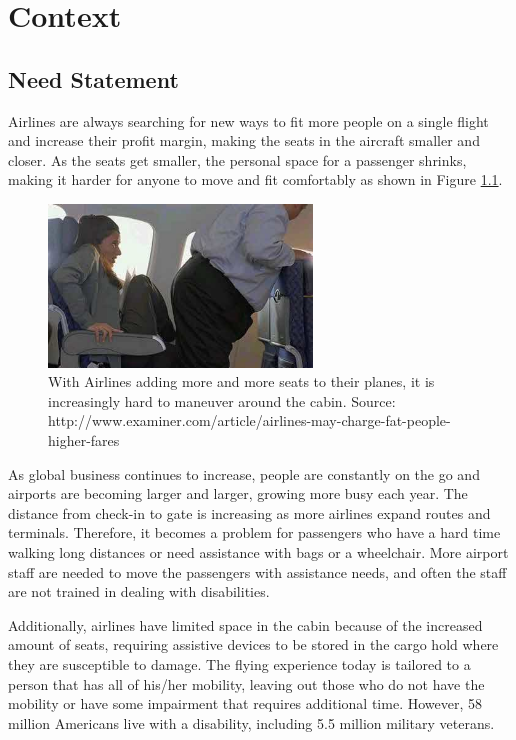 \chapter{Context}
\label{sec-context} %

\section{Need Statement}
Airlines are always searching for new ways to fit more people on a single flight and increase their profit margin, making the seats in the aircraft smaller and closer. As the seats get smaller, the personal space for a passenger shrinks, making it harder for anyone to move and fit comfortably as shown in Figure \ref{fig:9}.

\begin{figure}[h]
  \centering
     \includegraphics[width=7cm]{images/image009.png}
   \caption{With Airlines adding more and more seats to their planes, it is increasingly hard to maneuver around the cabin. 
                  Source: http://www.examiner.com/article/airlines-may-charge-fat-people-higher-fares}
  \label{fig:9}
\end{figure}


As global business continues to increase, people are constantly on the go and airports are becoming larger and larger, growing more busy each year.  The distance from check-in to gate is increasing as more airlines expand routes and terminals.    Therefore, it becomes a problem for passengers who have a hard time walking long distances or need assistance with bags or a wheelchair. More airport staff are needed to move the passengers with assistance needs, and often the staff are not trained in dealing with disabilities.  

Additionally, airlines have  limited space in the cabin because of the increased amount of seats, requiring assistive devices  to be stored in the cargo hold where they are susceptible to damage.  The flying experience today is tailored to a person that has all of his/her mobility, leaving out those who do not have the mobility or have some impairment that requires additional time. However, 58 million Americans live with a disability, including 5.5 million military veterans. %

